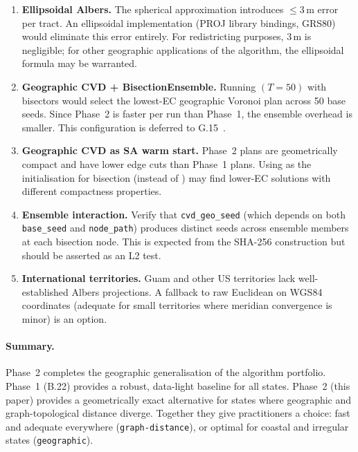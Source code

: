 \begin{enumerate}
\item \textbf{Ellipsoidal Albers.}
  The spherical approximation introduces $\le 3$\,m error per tract.
  An ellipsoidal implementation (PROJ library bindings, GRS80) would
  eliminate this error entirely.
  For redistricting purposes, 3\,m is negligible; for other geographic
  applications of the algorithm, the ellipsoidal formula may be warranted.

\item \textbf{Geographic CVD + BisectionEnsemble.}
  Running \be{}$(T=50)$ with \cvdgeo{} bisectors would select the
  lowest-EC geographic Voronoi plan across 50 base seeds.
  Since Phase~2 is faster per run than Phase~1, the ensemble overhead
  is smaller.
  This configuration is deferred to G.15~\citep{dellaLibera2026comparison}.

\item \textbf{Geographic CVD as SA warm start.}
  Phase~2 plans are geometrically compact and have lower edge cuts than
  Phase~1 plans.
  Using \cvdgeo{} as the initialisation for \sa{} bisection
  (instead of \metis{}) may find lower-EC solutions with different
  compactness properties.

\item \textbf{Ensemble interaction.}
  Verify that \texttt{cvd\_geo\_seed} (which depends on both
  \texttt{base\_seed} and \texttt{node\_path}) produces distinct seeds
  across ensemble members at each bisection node.
  This is expected from the SHA-256 construction but should be asserted
  as an L2 test.

\item \textbf{International territories.}
  Guam and other US territories lack well-established Albers projections.
  A fallback to raw Euclidean on WGS84 coordinates (adequate for
  small territories where meridian convergence is minor) is an option.
\end{enumerate}

\paragraph{Summary.}
Phase~2 \cvdgeo{} completes the geographic generalisation of the \cvd{}
algorithm portfolio.
Phase~1 (B.22) provides a robust, data-light baseline for all states.
Phase~2 (this paper) provides a geometrically exact alternative for states
where geographic and graph-topological distance diverge.
Together they give practitioners a choice: fast and adequate everywhere
(\texttt{graph-distance}), or optimal for coastal and irregular states
(\texttt{geographic}).
